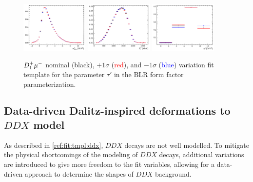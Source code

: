 \begin{figure}[!htb]
    \centering
    \includegraphics[width=0.3\textwidth]{./figs-fit-fit-variations/histo-var/D0_iso_D1ststMu__vs__D0_iso_D1ststMu_u1m__vs__D0_iso_D1ststMu_u1p__m2miss.pdf}
    \includegraphics[width=0.3\textwidth]{./figs-fit-fit-variations/histo-var/D0_iso_D1ststMu__vs__D0_iso_D1ststMu_u1m__vs__D0_iso_D1ststMu_u1p__el.pdf}
    \includegraphics[width=0.3\textwidth]{./figs-fit-fit-variations/histo-var/D0_iso_D1ststMu__vs__D0_iso_D1ststMu_u1m__vs__D0_iso_D1ststMu_u1p__q2.pdf}

    \caption{
        $D_1^+{\mu^-}$ nominal (black),
        $+ 1\sigma$ (\textcolor{red}{red}),
        and
        $- 1\sigma$ (\textcolor{blue}{blue})
        variation fit template for
        the parameter $\tau'$
        in the BLR form factor parameterization.
    }
    \label{fig:fit-variations:ff}
\end{figure}


\subsection{Data-driven Dalitz-inspired deformations to $DDX$ model}
\label{ref:fit:var:ddx}

As described in \cref{ref:fit:tmpl:ddx}, $DDX$ decays are not well modelled.
To mitigate the physical shortcomings of the modeling of $DDX$ decays,
additional variations are introduced to give more freedom to the fit variables,
allowing for a data-driven approach to determine the shapes of $DDX$ background.

